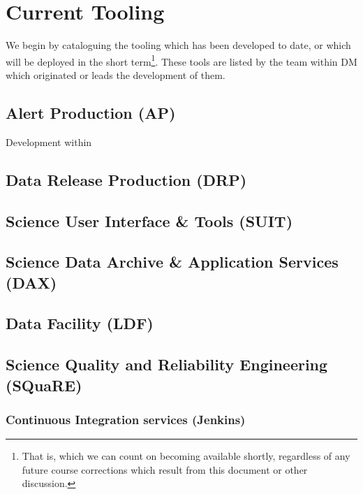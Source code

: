 \documentclass[DM,authoryear,toc,lsstdraft]{lsstdoc}
\begin{document}
\section{Current Tooling}
\label{sec:current}

We begin by cataloguing the tooling which has been developed to date, or which
will be deployed in the short term\footnote{That is, which we can count on
becoming available shortly, regardless of any future course corrections which
result from this document or other discussion.}. These tools are listed by the
team within DM which originated or leads the development of them.

\subsection{Alert Production (AP)}
\label{sec:current:ap}

Development within 

\subsection{Data Release Production (DRP)}
\label{sec:current:drp}

\subsection{Science User Interface \& Tools (SUIT)}
\label{sec:current:suit}

\subsection{Science Data Archive \& Application Services (DAX)}
\label{sec:current:dax}

\subsection{Data Facility (LDF)}
\label{sec:current:ldf}

\subsection{Science Quality and Reliability Engineering (SQuaRE)}
\label{sec:current:square}

\subsubsection{Continuous Integration services (Jenkins)}
\label{sec:current:square:ci}
\end{document}
